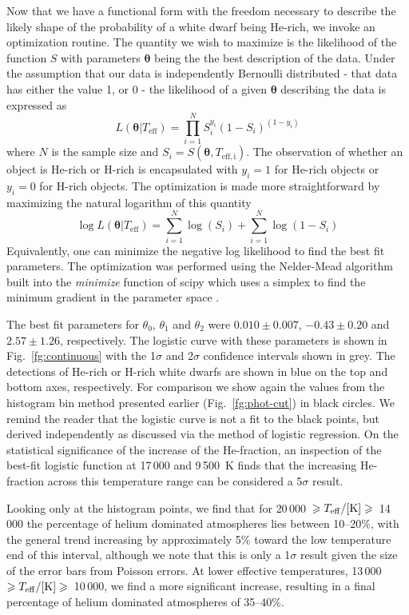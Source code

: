 \documentclass[a4paper,fleqn,usenatbib]{mnras}
\newcommand{\treverse}[2]{{#1}~$\geqslant T_{\mathrm{eff}}/{\rm [K]} \geqslant $~{#2}}
\newcommand{\mteff}{T_{\mathrm{eff}}}
\begin{document}
Now that we have a functional form with the freedom necessary to describe the likely shape of the probability of a white dwarf being He-rich, we invoke an optimization routine. The quantity we wish to maximize is the likelihood of the function $S$ with parameters $\bm{\theta}$ being the the best description of the data. Under the assumption that our data is independently Bernoulli distributed - that data has either the value 1, or 0 - the likelihood of a given $\bm{\theta}$ describing the data is expressed as
\begin{equation}
 L(\bm{\theta} | \mteff) = \prod_{i=1}^N{S_i^{y_i}(1-S_i)^{(1-y_i)}}
\end{equation}
where $N$ is the sample size and $S_i = S(\bm{\theta}, T_{\mathrm{eff,i}})$. The observation of whether an object is He-rich or H-rich is encapsulated with $y_i=1$ for He-rich objects or $y_i=0$ for H-rich objects. The optimization is made more straightforward by maximizing the natural logarithm of this quantity
\begin{equation}
 \log L(\bm{\theta} | \mteff) = \sum_{i=1}^N{\log(S_i)} + \sum_{i=1}^N{\log(1 - S_i)}
\end{equation}
Equivalently, one can minimize the negative log likelihood to find the best fit parameters. The optimization was performed using the Nelder-Mead algorithm built into the {\it minimize} function of {\sc scipy} which uses a simplex to find the minimum gradient in the parameter space \citep{scipy}.

The best fit parameters for $\theta_0$, $\theta_1$ and $\theta_2$ were $0.010\pm0.007$, $-0.43\pm0.20$ and $2.57\pm1.26$, respectively. The logistic curve with these parameters is shown in Fig.~\ref{fg:continuous} with the 1$\sigma$ and 2$\sigma$ confidence intervals shown in grey. The detections of He-rich or H-rich white dwarfs are shown in blue on the top and bottom axes, respectively. For comparison we show again the values from the histogram bin method presented earlier (Fig.~\ref{fg:phot-cut}) in black circles. We remind the reader that the logistic curve is not a fit to the black points, but derived independently as discussed via the method of logistic regression. On the statistical significance of the increase of the He-fraction, an inspection of the best-fit logistic function at 17\,000 and 9\,500~K finds that the increasing He-fraction across this temperature range can be considered a 5$\sigma$ result. 

Looking only at the histogram points, we find that for \treverse{20\,000}{14\,000} the percentage of helium dominated atmospheres lies between 10--20\%, with the general trend increasing by approximately 5\% toward the low temperature end of this interval, although we note that this is only a 1$\sigma$ result given the size of the error bars from Poisson errors. At lower effective temperatures, \treverse{13\,000}{10\,000}, we find a more significant increase, resulting in a final percentage of helium dominated atmospheres of 35--40\%.
\end{document}
